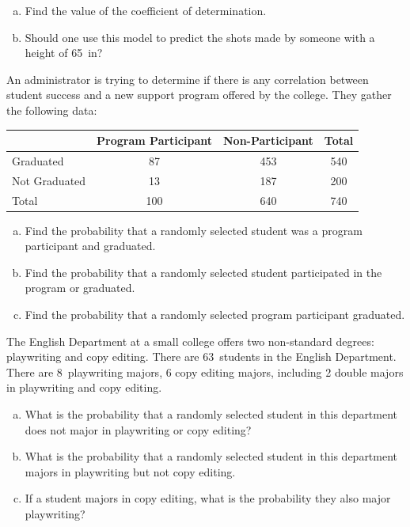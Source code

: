 \documentclass[12pt,letterpaper]{exam}
\begin{document}
\begin{questions}
\begin{enumerate}[(a)]
	\item Find the value of the coefficient of determination. \pvspace{3cm}
	
	\item Should one use this model to predict the shots made by someone with a height of 65~in?	
	\end{enumerate}



\newpage
\question[10] An administrator is trying to determine if there is any correlation between student success and a new support program offered by the college. They gather the following data:
	\begin{table}[!ht]
	\centering
	\begin{tabular}{|l||c|c|c|} \hline
	& Program Participant & Non-Participant & Total \\ \hline \hline
	Graduated & 87 & 453 & 540 \\ \hline
	Not Graduated & 13 & 187 & 200 \\ \hline \hline
	Total & 100 & 640 & 740 \\ \hline
	\end{tabular}
	\end{table}

\begin{enumerate}[(a)]
\item Find the probability that a randomly selected student was a program participant and graduated.
\item Find the probability that a randomly selected student participated in the program or graduated. 
\item Find the probability that a randomly selected program participant graduated. 
\end{enumerate}



\newpage
\question[10] The English Department at a small college offers two non-standard degrees: playwriting and copy editing. There are 63~students in the English Department. There are 8~playwriting majors, 6 copy editing majors, including 2 double majors in playwriting and copy editing. 
	\begin{enumerate}[(a)]
	\item What is the probability that a randomly selected student in this department does not major in playwriting or copy editing?
	\item What is the probability that a randomly selected student in this department majors in playwriting but not copy editing. 
	\item If a student majors in copy editing, what is the probability they also major playwriting?
	\end{enumerate}




\end{questions}
\end{document}

